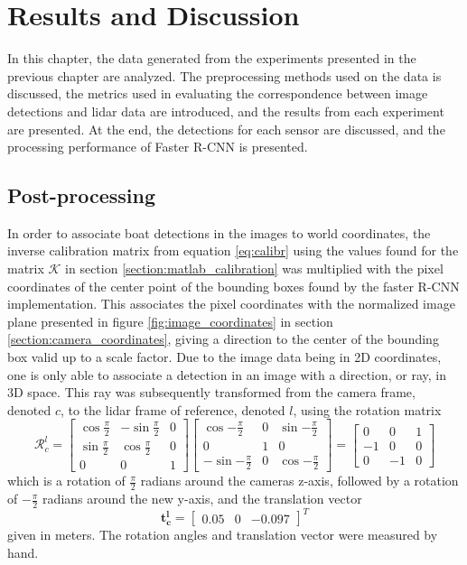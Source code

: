 
\chapter{Results and Discussion}
In this chapter, the data generated from the experiments presented in the previous chapter are analyzed. The preprocessing methods used on the data is discussed, the metrics used in evaluating the correspondence between image detections and lidar data are introduced, and the results from each experiment are presented. At the end, the detections for each sensor are discussed, and the processing performance of Faster R-CNN is presented.
\section{Post-processing}
In order to associate boat detections in the images to world coordinates, the inverse calibration matrix from equation \ref{eq:calibr} using the values found for the matrix $\mathcal{K}$ in section \ref{section:matlab_calibration} was multiplied with the pixel coordinates of the center point of the bounding boxes found by the faster R-CNN implementation. This associates the pixel coordinates with the normalized image plane presented in figure \ref{fig:image_coordinates} in section \ref{section:camera_coordinates}, giving a direction to the center of the bounding box valid up to a scale factor. Due to the image data being in 2D coordinates, one is only able to associate a detection in an image with a direction, or ray, in 3D space. This ray was subsequently transformed from the camera frame, denoted $c$, to the lidar frame of reference, denoted $l$, using the rotation matrix
\begin{equation}
\mathcal{R}_c^l=\begin{bmatrix}
\cos{\frac{\pi}{2}} & -\sin{\frac{\pi}{2}} & 0 \\
\sin{\frac{\pi}{2}} & \cos{\frac{\pi}{2}} & 0 \\
0 & 0 & 1
\end{bmatrix}\begin{bmatrix}
\cos{-\frac{\pi}{2}} & 0 & \sin{-\frac{\pi}{2}}\\
0 & 1 & 0 \\
-\sin{-\frac{\pi}{2}} & 0 & \cos{-\frac{\pi}{2}}
\end{bmatrix}=\begin{bmatrix}
0 & 0 & 1\\
-1 & 0 & 0\\
0 & -1 & 0
\end{bmatrix}
\end{equation}
which is a rotation of $\frac{\pi}{2}$ radians around the cameras z-axis, followed by a rotation of $-\frac{\pi}{2}$ radians around the new y-axis, and the translation vector
\begin{equation}
\mathbf{t_c^l}=\begin{bmatrix}
0.05 & 0 & -0.097
\end{bmatrix}^T
\end{equation} 
given in meters. The rotation angles and translation vector were measured by hand.

